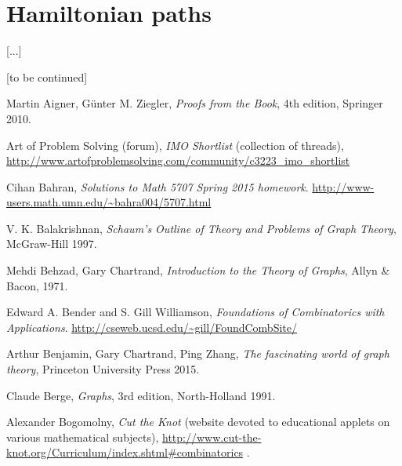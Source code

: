 \documentclass[numbers=enddot,12pt,final,onecolumn,notitlepage]{scrartcl}%
\theoremstyle{definition}
\begin{document}
\section{\label{sect.hamilton}Hamiltonian paths}


[...]

[to be continued]

\begin{thebibliography}{9999999999}                                                                                       %

Martin Aigner, G\"{u}nter M. Ziegler,
\textit{Proofs from the Book}, 4th edition, Springer 2010.

Art of Problem Solving (forum),
\textit{IMO Shortlist} (collection of threads),
\newline
\url{http://www.artofproblemsolving.com/community/c3223_imo_shortlist}


Cihan Bahran,
\textit{Solutions to Math 5707 Spring 2015 homework}.
\newline \url{http://www-users.math.umn.edu/~bahra004/5707.html}

V. K. Balakrishnan,
\textit{Schaum's Outline of Theory and Problems of Graph Theory},
McGraw-Hill 1997.


Mehdi Behzad, Gary Chartrand,
\textit{Introduction to the Theory of Graphs},
Allyn \& Bacon, 1971.

Edward A. Bender and S. Gill Williamson,
\textit{Foundations of Combinatorics with Applications}.
\newline \url{http://cseweb.ucsd.edu/~gill/FoundCombSite/}

Arthur Benjamin, Gary Chartrand,
Ping Zhang,
\textit{The fascinating world of graph theory},
Princeton University Press 2015.

Claude Berge,
\textit{Graphs}, 3rd edition, North-Holland 1991.

Alexander Bogomolny,
\textit{Cut the Knot} (website devoted to educational applets on
various mathematical subjects),
\url{http://www.cut-the-knot.org/Curriculum/index.shtml#combinatorics} .


\end{thebibliography}
\end{document}
